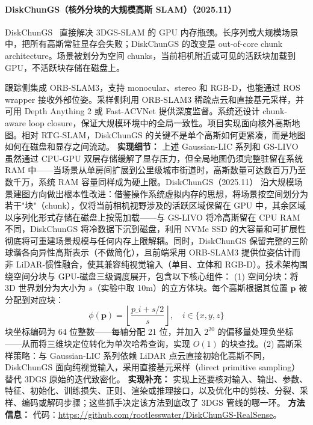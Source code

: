 \paragraph{DiskChunGS（核外分块的大规模高斯 SLAM）（2025.11）}
DiskChunGS~\cite{2511_23030} 直接解决 3DGS-SLAM 的 GPU 内存瓶颈。长序列或大规模场景中，把所有高斯常驻显存会失败；DiskChunGS 的改变是 out-of-core chunk architecture。场景被划分为空间 chunks，当前相机附近或可见的活跃块加载到 GPU，不活跃块存储在磁盘上。

跟踪侧集成 ORB-SLAM3，支持 monocular、stereo 和 RGB-D，也能通过 ROS wrapper 接收外部位姿。采样侧利用 ORB-SLAM3 稀疏点云和直接基元采样，并可用 Depth Anything 2 或 Fast-ACVNet 提供深度监督。系统还设计 chunk-aware loop closure，保证大规模环境中的全局一致性。项目实现面向核外高斯地图。相对 RTG-SLAM，DiskChunGS 的关键不是单个高斯如何更紧凑，而是地图如何在磁盘和显存之间流动。
\textbf{实现细节：} 上述 Gaussian-LIC 系列和 GS-LIVO 虽然通过 CPU-GPU 双层存储缓解了显存压力，但全局地图仍须完整驻留在系统 RAM 中——当场景从单房间扩展到公里级城市街道时，高斯数量可达数百万乃至数千万，系统 RAM 容量同样成为硬上限。DiskChunGS（2025.11） 沿大规模场景建图方向做出根本性改进：借鉴操作系统虚拟内存的思想，将场景按空间划分为若干"块"（chunk），仅将当前相机视野涉及的活跃区域保留在 GPU 中，其余区域以序列化形式存储在磁盘上按需加载——与 GS-LIVO 将冷高斯留在 CPU RAM 不同，DiskChunGS 将冷数据下沉到磁盘，利用 NVMe SSD 的大容量和可扩展性彻底将可重建场景规模与任何内存上限解耦。同时，DiskChunGS 保留完整的三阶球谐各向异性高斯表示（不做简化），且前端采用 ORB-SLAM3 提供位姿估计而非 LiDAR-惯性融合，使其兼容纯视觉输入（单目、立体和 RGB-D）。技术架构围绕空间分块与 GPU-磁盘三级调度展开，包含以下核心组件： (1) 空间分块：将 3D 世界划分为大小为 $s$（实验中取 10m）的立方体块。每个高斯根据其位置 $\mathbf{p}$ 被分配到对应块： \[ \phi(\mathbf{p}) = \left\lfloor \frac{p\_i + s/2}{s} \right\rfloor, \quad i \in \{x,y,z\} \] 块坐标编码为 64 位整数——每轴分配 21 位，并加入 $2^{20}$ 的偏移量处理负坐标——从而将三维块定位转化为单次哈希查询，实现 $O(1)$ 的块查找。(2) 高斯采样策略：与 Gaussian-LIC 系列依赖 LiDAR 点云直接初始化高斯不同，DiskChunGS 面向纯视觉输入，采用直接基元采样（direct primitive sampling）替代 3DGS 原始的迭代致密化。
\textbf{实现补充：} 实现上还要核对输入、输出、参数、特征、初始化、训练损失、正则、渲染或推理接口，以及优化中的剪枝、分裂、采样、编码或解码步骤；这些抓手决定该方法到底改了 3DGS 管线的哪一环。
\textbf{方法信息：} 代码：\url{https://github.com/rootlesswater/DiskChunGS-RealSense}。
